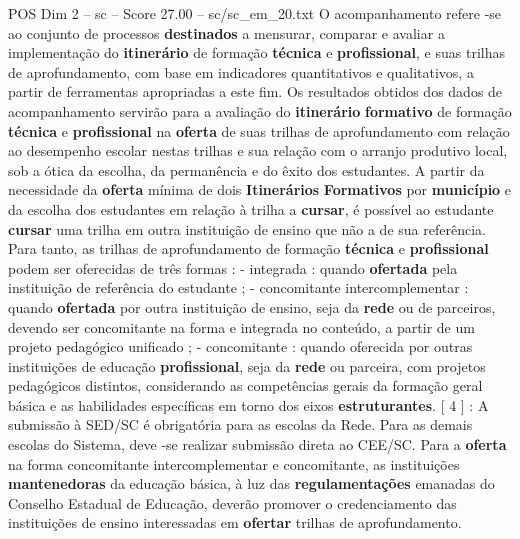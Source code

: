 \begin{textsample}{POS Dim 2 – sc – Score 27.00 – sc/sc\_em\_20.txt}
O acompanhamento refere -se ao conjunto de processos \textbf{destinados} a mensurar, comparar e avaliar a implementação do \textbf{itinerário} de formação \textbf{técnica} e \textbf{profissional}, e suas trilhas de aprofundamento, com base em indicadores quantitativos e qualitativos, a partir de ferramentas apropriadas a este fim.
Os resultados obtidos dos dados de acompanhamento servirão para a avaliação do \textbf{itinerário} \textbf{formativo} de formação \textbf{técnica} e \textbf{profissional} na \textbf{oferta} de suas trilhas de aprofundamento com relação ao desempenho escolar nestas trilhas e sua relação com o arranjo produtivo local, sob a ótica da escolha, da permanência e do êxito dos estudantes.
A partir da necessidade da \textbf{oferta} mínima de dois \textbf{Itinerários} \textbf{Formativos} por \textbf{município} e da escolha dos estudantes em relação à trilha a \textbf{cursar}, é possível ao estudante \textbf{cursar} uma trilha em outra instituição de ensino que não a de sua referência.
Para tanto, as trilhas de aprofundamento de formação \textbf{técnica} e \textbf{profissional} podem ser oferecidas de três formas : - integrada : quando \textbf{ofertada} pela instituição de referência do estudante ; - concomitante intercomplementar : quando \textbf{ofertada} por outra instituição de ensino, seja da \textbf{rede} ou de parceiros, devendo ser concomitante na forma e integrada no conteúdo, a partir de um projeto pedagógico unificado ; - concomitante : quando oferecida por outras instituições de educação \textbf{profissional}, seja da \textbf{rede} ou parceira, com projetos pedagógicos distintos, considerando as competências gerais da formação geral básica e as habilidades específicas em torno dos eixos \textbf{estruturantes}. [ 4 ] : A submissão à SED/SC é obrigatória para as escolas da Rede.
Para as demais escolas do Sistema, deve -se realizar submissão direta ao CEE/SC.
Para a \textbf{oferta} na forma concomitante intercomplementar e concomitante, as instituições \textbf{mantenedoras} da educação básica, à luz das \textbf{regulamentações} emanadas do Conselho Estadual de Educação, deverão promover o credenciamento das instituições de ensino interessadas em \textbf{ofertar} trilhas de aprofundamento.

\end{textsample}
